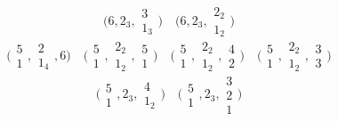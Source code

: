 \documentclass[11pt,a4paper]{article}
\begin{document}
\[
  \bigl(6, 2_3, \begin{smallmatrix}3\\1_3\end{smallmatrix}\bigr) \quad
  \bigl(6, 2_3, \begin{smallmatrix}2_2\\1_2\end{smallmatrix}\bigr)
\]
\[
  \bigl(\begin{smallmatrix}5\\1\end{smallmatrix}, \begin{smallmatrix}2\\1_4\end{smallmatrix}, 6\bigr) \quad
  \bigl(\begin{smallmatrix}5\\1\end{smallmatrix}, \begin{smallmatrix}2_2\\1_2\end{smallmatrix}, \begin{smallmatrix}5\\1\end{smallmatrix}\bigr) \quad
  \bigl(\begin{smallmatrix}5\\1\end{smallmatrix}, \begin{smallmatrix}2_2\\1_2\end{smallmatrix}, \begin{smallmatrix}4\\2\end{smallmatrix}\bigr) \quad
  \bigl(\begin{smallmatrix}5\\1\end{smallmatrix}, \begin{smallmatrix}2_2\\1_2\end{smallmatrix}, \begin{smallmatrix}3\\3\end{smallmatrix}\bigr)
\]
\[
  \bigl(\begin{smallmatrix}5\\1\end{smallmatrix}, 2_3, \begin{smallmatrix}4\\1_2\end{smallmatrix}\bigr) \quad
  \bigl(\begin{smallmatrix}5\\1\end{smallmatrix}, 2_3, \begin{smallmatrix}3\\2\\1\end{smallmatrix}\bigr)
\]
\end{document}
